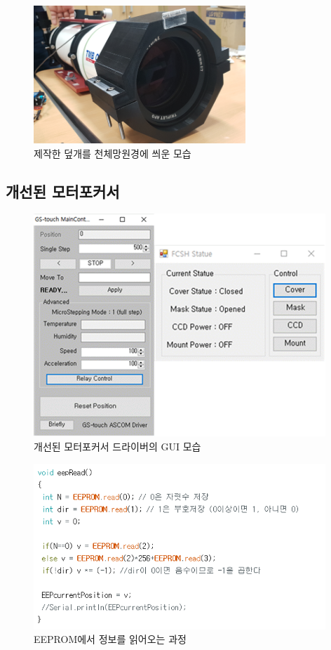 \documentclass[twoside,11pt]{gshs_thesis}
\begin{document}
 \begin{figure}[h]
	\begin{center}
		\includegraphics[width = 8cm]{cover}
	\end{center}
	\caption{제작한 덮개를 천체망원경에 씌운 모습}
	\label{cover}
\end{figure}

\newpage
\subsection{개선된 모터포커서}

 \begin{figure}[h]
	\begin{center}
		\includegraphics[width = 11cm]{maincontrol}
	\end{center}
	\caption{개선된 모터포커서 드라이버의 GUI 모습}
	\label{maincontrol}
\end{figure}

 \begin{figure}[h]
	\begin{center}
		\includegraphics[width = 11cm]{eepread}
	\end{center}
	\caption{EEPROM에서 정보를 읽어오는 과정}
	\label{eepread}
\end{figure}
\end{document}
